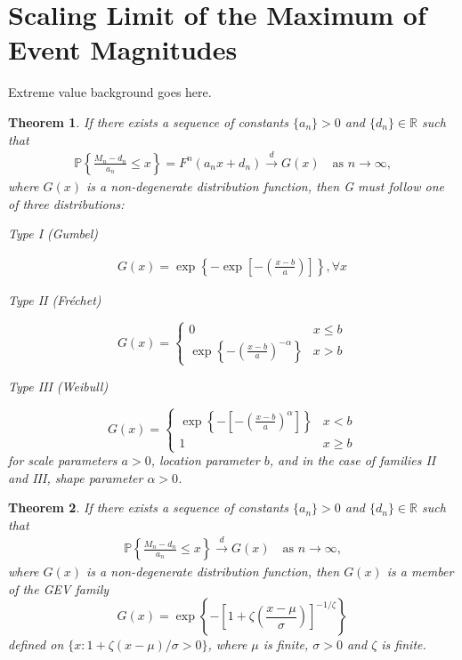 \documentclass[honours,12pt]{UNSWthesis}
\newcommand{\R}{\mathbb{R}}
\newcommand{\PP}{\mathbb{P}}
\newcommand{\1}{\mathbf 1}
\newcommand{\cd}{\overset{d}{\longrightarrow}}
\newtheorem{theorem}{Theorem}[section]
\numberwithin{equation}{section}
\theoremstyle{definition}
\theoremstyle{remark}
\begin{document}
\section{Scaling Limit of the Maximum of Event Magnitudes}\label{s:max}

Extreme value background goes here.

\begin{theorem}\cite{ColesBook}
	If there exists a sequence of constants $\{a_n\}>0$ and $\{d_n\}\in \R$ such that
\begin{align*}
\PP\left\{\frac{M_n-d_n}{a_n}\leq x\right\}=F^n(a_nx+d_n)\cd G(x)\quad\textrm{as $n\to\infty$,}
\end{align*}	
	where $G(x)$ is a non-degenerate distribution function, then G must follow one of three distributions:
	\begin{center}Type I (Gumbel)\end{center}
	\begin{align*}
		G(x)=\exp\left\{-\exp\left[-\left(\frac{x-b}{a} \right) \right] \right\}, \forall x
	\end{align*}
	\begin{center}Type II (Fr\'{e}chet)\end{center}
	\[
		G(x)=\begin{cases}
		0 &x\leq b\\
			\exp\left\{-\left(\frac{x-b}{a}\right)^{-\alpha}\right\} &x>b
			\end{cases}
	\]
	\begin{center}Type III (Weibull)\end{center}
	\[
		G(x)=\begin{cases}\exp\left\{-\left[-\left(\frac{x-b}{a}\right)^{\alpha}\right]\right\} &x<b\\
		1 &x\geq b				
			\end{cases}
			\]
\noindent for scale parameters $a>0$, location parameter $b$, and in the case of families II and III, shape parameter $\alpha>0$.
\end{theorem}

\begin{theorem}\cite{ColesBook}
	If there exists a sequence of constants $\{a_n\}>0$ and $\{d_n\}\in \R$ such that
	\begin{align*}
	\PP\left\{\frac{M_n-d_n}{a_n}\leq x\right\}\cd G(x)\quad\textrm{as $n\to\infty$,}
	\end{align*}	
	where $G(x)$ is a non-degenerate distribution function, then $G(x)$ is a member of the GEV family
	\[
		G(x)=\exp\left\{-\left[1+\zeta\left(\frac{x-\mu}{\sigma}\right)\right]^{-1/\zeta}\right\}
	\]
	defined on $\{x:1+\zeta(x-\mu)/\sigma>0\}$, where $\mu$ is finite, $\sigma>0$ and $\zeta$ is finite.
\end{theorem}
\end{document}
